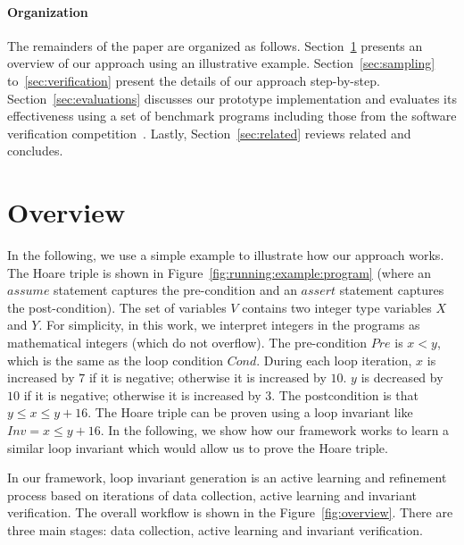 \paragraph{Organization} The remainders of the paper are organized as follows. Section~\ref{sec:overview} presents an overview of our approach using an illustrative example. Section~\ref{sec:sampling} to~\ref{sec:verification} present the details of our approach step-by-step. Section~\ref{sec:evaluations} discusses our prototype implementation and evaluates its effectiveness using a set of benchmark programs including those from the software verification competition~\cite{}. Lastly, Section~\ref{sec:related} reviews related and concludes.

\section{Overview} \label{sec:overview}
In the following, we use a simple example to illustrate how our approach works. The Hoare triple is shown in Figure~\ref{fig:running:example:program} (where an $assume$ statement captures the pre-condition and an $assert$ statement captures the post-condition). The set of variables $V$ contains two integer type variables $X$ and $Y$. For simplicity, in this work, we interpret integers in the programs as mathematical integers (which do not overflow). The pre-condition $Pre$ is $x < y$, which is the same as the loop condition $Cond$.
During each loop iteration, $x$ is increased by $7$ if it is negative; otherwise it is increased by $10$. $y$ is decreased by $10$ if it is negative; otherwise it is increased by $3$. The postcondition is that $y \le x \le y + 16$.
The Hoare triple can be proven using a loop invariant like $Inv = x \le y + 16$. In the following, we show how our framework works to learn a similar loop invariant which would allow us to prove the Hoare triple.

In our framework, loop invariant generation is an active learning and refinement process based on iterations of data collection, active learning and invariant verification. The overall workflow is shown in the Figure~\ref{fig:overview}. There are three main stages: data collection, active learning and invariant verification.

